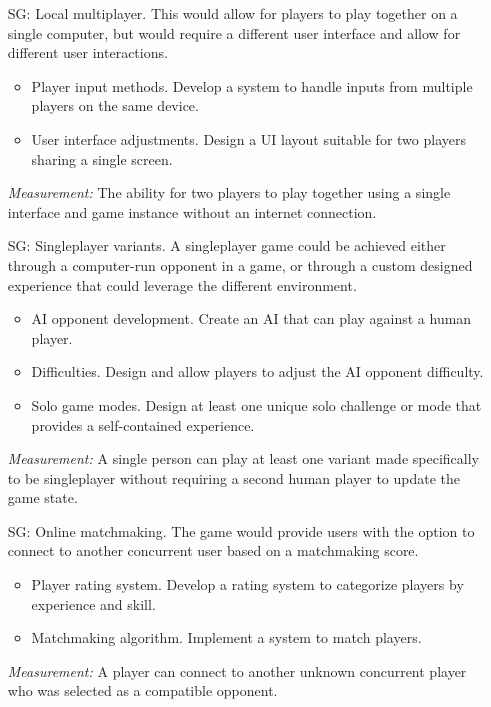 \begin{itemize}

	\item[SG\refstepcounter{goalnum}\thegoalnum \label{G_local_multiplayer}:] Local multiplayer. This would allow for players to play together on a single computer, but would require a different user interface and allow for different user interactions.
	\begin{itemize}
        \item Player input methods. Develop a system to handle inputs from multiple players on the same device.
        \item User interface adjustments. Design a UI layout suitable for two players sharing a single screen.
    \end{itemize}
	\textit{Measurement:} The ability for two players to play together using a single interface and game instance without an internet connection.

	\item[SG\refstepcounter{goalnum}\thegoalnum \label{G_singleplayer}:] Singleplayer variants. A singleplayer game could be achieved either through a computer-run opponent in a game, or through a custom designed experience that could leverage the different environment.
	\begin{itemize}
        \item AI opponent development. Create an AI that can play against a human player.
        \item Difficulties. Design and allow players to adjust the AI opponent difficulty.
        \item Solo game modes. Design at least one unique solo challenge or mode that provides a self-contained experience.
    \end{itemize}
	\textit{Measurement:} A single person can play at least one variant made specifically to be singleplayer without requiring a second human player to update the game state.

	\item[SG\refstepcounter{goalnum}\thegoalnum \label{G_matchmaking}:] Online matchmaking. The game would provide users with the option to connect to another concurrent user based on a matchmaking score.
	\begin{itemize}
        \item Player rating system. Develop a rating system to categorize players by experience and skill.
        \item Matchmaking algorithm. Implement a system to match players.
    \end{itemize}
	\textit{Measurement:} A player can connect to another unknown concurrent player who was selected as a compatible opponent.


\end{itemize}
